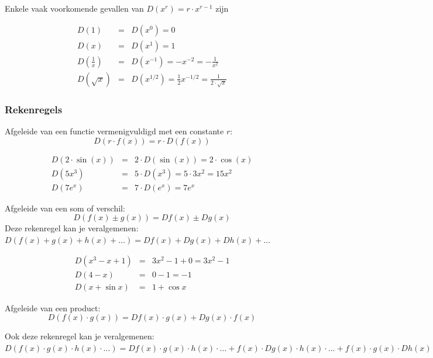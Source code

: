 Enkele vaak voorkomende gevallen van $D(x^r)=r\cdot x^{r-1}$ zijn

\begin{eqnarray*}
D(1) &=& D(x^0) = 0 \\
D(x) &=& D(x^1) = 1 \\
D(\frac{1}{x})&=&D(x^{-1})=-x^{-2}=-\frac{1}{x^2}\\
D(\sqrt{x})&=&D(x^{1/2})=\frac{1}{2}x^{-1/2}=\frac{1}{2 \cdot \sqrt{x}}
\end{eqnarray*}

\subsubsection{Rekenregels}

\begin{ftrekenregel}
	Afgeleide van een functie vermenigvuldigd met een constante $r$:
	\begin{equation*}
	D(r \cdot f(x)) = r \cdot D(f(x))
	\end{equation*}
\end{ftrekenregel}

\begin{voorbeeld}
\begin{eqnarray*}
D(2 \cdot \sin (x))&=&2 \cdot D(\sin (x))=2 \cdot \cos (x) \\
D(5x^3)&=&5\cdot D(x^3)=5\cdot 3x^2=15x^2\\
D(7e^x)&=& 7 \cdot D(e^x) =7e^x
\end{eqnarray*}
\end{voorbeeld}

\begin{ftrekenregel}
	Afgeleide van een som of verschil:
	\begin{equation*}
	D(f(x)\pm g(x)) = Df(x) \pm Dg(x)
	\end{equation*}
	Deze rekenregel kan je veralgemenen: 
	$D\left(f(x)+g(x)+h(x)+\ldots\right)=Df(x)+Dg(x)+Dh(x)+\ldots$
\end{ftrekenregel}

\begin{voorbeeld}
\begin{eqnarray*}
D(x^3-x+1)&=& 3x^2-1+0=3x^2-1\\
D(4-x)&=&0-1=-1\\
D(x+\sin x)&=&1+\cos x
\end{eqnarray*}
\end{voorbeeld}

\begin{ftrekenregel}
	Afgeleide van een product: 
	\begin{equation*}
	D(f(x) \cdot g(x)) = Df(x) \cdot g(x) + Dg(x) \cdot f(x)
	\end{equation*}
	
	Ook deze rekenregel kan je veralgemenen: $D\left(f(x)\cdot g(x)\cdot h(x)\cdot\ldots\right)=Df(x)\cdot g(x)\cdot h(x)\cdot\ldots+f(x)\cdot Dg(x)\cdot h(x)\cdot\ldots+f(x)\cdot g(x)\cdot Dh(x)\cdot\ldots+$
\end{ftrekenregel}

